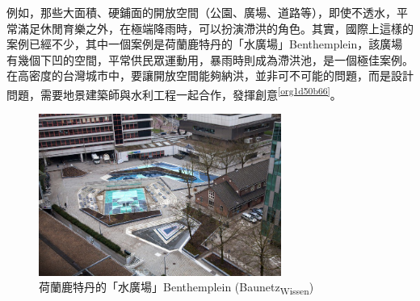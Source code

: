 \documentclass[a4paper,12pt]{article}
\begin{document}
例如，那些大面積、硬鋪面的開放空間（公園、廣場、道路等），即使不透水，平常滿足休閒育樂之外，在極端降雨時，可以扮演滯洪的角色。其實，國際上這樣的案例已經不少，其中一個案例是荷蘭鹿特丹的「水廣場」Benthemplein，該廣場有幾個下凹的空間，平常供民眾運動用，暴雨時則成為滯洪池，是一個極佳案例。在高密度的台灣城市中，要讓開放空間能夠納洪，並非可不可能的問題，而是設計問題，需要地景建築師與水利工程一起合作，發揮創意\textsuperscript{\ref{org1d50b66}}。\\

\begin{figure}[htbp]
\centering
\includegraphics[width=300]{images/161236830025147_P3592665.jpg}
\caption{\label{fig:Benthemplein}荷蘭鹿特丹的「水廣場」Benthemplein (Baunetz\textsubscript{Wissen})}
\end{figure}
\newpage
\end{document}

